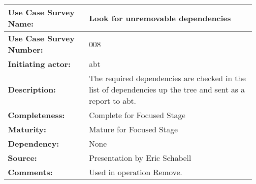 \begin{tabularx}{\linewidth}{|l|X|}
\hline
\textbf{Use Case Survey Name:} & \textbf{Look for unremovable dependencies} \\
\hline
\textbf{Use Case Survey Number:} & 008 \\
\hline
\textbf{Initiating actor:} & abt \\
\hline
\textbf{Description:} & The required dependencies are checked in the list of dependencies up the tree and sent as a report to abt.\\
\hline
\textbf{Completeness:} & Complete for Focused Stage \\
\hline
\textbf{Maturity:} & Mature for Focused Stage \\
\hline
\textbf{Dependency:} & None\\
\hline
\textbf{Source:} & Presentation by Eric Schabell \\
\hline
\textbf{Comments:} & Used in operation Remove. \\
\hline
\end{tabularx}
